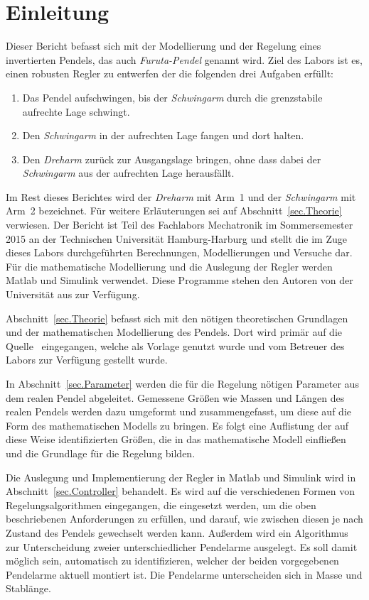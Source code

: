 \section{Einleitung}
\label{sec.Einleitung}

Dieser Bericht befasst sich mit der Modellierung und der Regelung eines invertierten Pendels, das auch \emph{Furuta-Pendel} genannt wird. 
Ziel des Labors ist es, einen robusten Regler zu entwerfen der die folgenden drei Aufgaben erfüllt:
\begin{enumerate}
	\raggedright
	\item Das Pendel aufschwingen, bis der \emph{Schwingarm} durch die grenzstabile aufrechte Lage schwingt.
	\item Den \emph{Schwingarm} in der aufrechten Lage fangen und dort halten.
	\item Den \emph{Dreharm} zurück zur Ausgangslage bringen, ohne dass dabei der \emph{Schwingarm} aus der aufrechten Lage herausfällt.
\end{enumerate}
Im Rest dieses Berichtes wird der \emph{Dreharm} mit Arm~1 und der \emph{Schwingarm} mit Arm~2 bezeichnet.
Für weitere Erläuterungen sei auf Abschnitt~\ref{sec.Theorie} verwiesen.
Der Bericht ist Teil des Fachlabors Mechatronik im Sommersemester 2015 an der Technischen Universität Hamburg-Harburg und stellt die im Zuge dieses Labors durchgeführten Berechnungen, Modellierungen und Versuche dar. 
Für die mathematische Modellierung und die Auslegung der Regler werden Matlab und Simulink verwendet.
Diese Programme stehen den Autoren von der Universität aus zur Verfügung.

Abschnitt~\ref{sec.Theorie} befasst sich mit den nötigen theoretischen Grundlagen und der mathematischen Modellierung des Pendels.
Dort wird primär auf die Quelle~\citep{Cazzolato.2011} eingegangen, welche als Vorlage genutzt wurde und vom Betreuer des Labors zur Verfügung gestellt wurde.

In Abschnitt~\ref{sec.Parameter} werden die für die Regelung nötigen Parameter aus dem realen Pendel abgeleitet. 
Gemessene Größen wie Massen und Längen des realen Pendels werden dazu umgeformt und zusammengefasst, um diese auf die Form des mathematischen Modells zu bringen.
Es folgt eine Auflistung der auf diese Weise identifizierten Größen, die in das mathematische Modell einfließen und die Grundlage für die Regelung bilden.

Die Auslegung und Implementierung der Regler in Matlab und Simulink wird in Abschnitt~\ref{sec.Controller} behandelt.
Es wird auf die verschiedenen Formen von Regelungsalgorithmen eingegangen, die eingesetzt werden, um die oben beschriebenen Anforderungen zu erfüllen, und darauf, wie zwischen diesen je nach Zustand des Pendels gewechselt werden kann.
Außerdem wird ein Algorithmus zur Unterscheidung zweier unterschiedlicher Pendelarme ausgelegt. 
Es soll damit möglich sein, automatisch zu identifizieren, welcher der beiden vorgegebenen Pendelarme aktuell montiert ist. 
Die Pendelarme unterscheiden sich in Masse und Stablänge.

